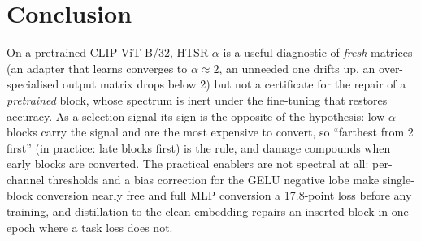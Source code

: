\section{Conclusion}
On a pretrained CLIP ViT-B/32, HTSR $\alpha$ is a useful diagnostic of \emph{fresh} matrices (an adapter that learns converges to $\alpha\approx2$, an unneeded one drifts up, an over-specialised output matrix drops below 2) but not a certificate for the repair of a \emph{pretrained} block, whose spectrum is inert under the fine-tuning that restores accuracy. As a selection signal its sign is the opposite of the hypothesis: low-$\alpha$ blocks carry the signal and are the most expensive to convert, so ``farthest from 2 first'' (in practice: late blocks first) is the rule, and damage compounds when early blocks are converted. The practical enablers are not spectral at all: per-channel thresholds and a bias correction for the GELU negative lobe make single-block conversion nearly free and full MLP conversion a 17.8-point loss before any training, and distillation to the clean embedding repairs an inserted block in one epoch where a task loss does not.

